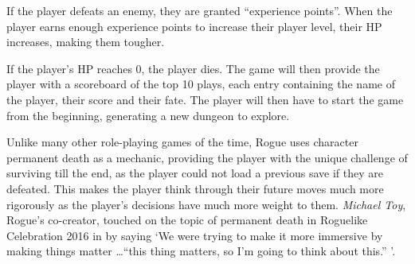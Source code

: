 \documentclass[12pt,a4paper]{article}
\begin{document}
    If the player defeats an enemy, they are granted ``experience points''.
    When the player earns enough experience points to increase their player level, their HP increases, making them tougher.

    If the player's HP reaches 0, the player dies.
    The game will then provide the player with a scoreboard of the top 10 plays, each entry containing the name of the player, their score and their fate.
    The player will then have to start the game from the beginning, generating a new dungeon to explore.

    Unlike many other role-playing games of the time, Rogue uses character permanent death as a mechanic, providing the player with
    the unique challenge of surviving till the end, as the player could not load a previous save if they are defeated.
    This makes the player think through their future moves much more rigorously as the player's decisions have much more weight to them.
    \emph{Michael Toy}, Rogue's co-creator, touched on the topic of permanent death in Roguelike Celebration 2016 in \citet{gamasutra16} by saying `We were trying to make it more immersive by making things matter \ldots ``this thing matters, so I'm going to think about this.'' '.




\end{document}

